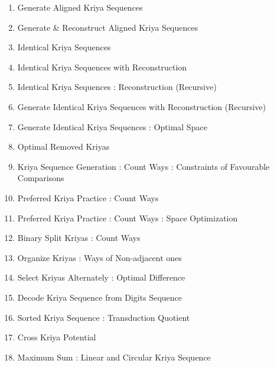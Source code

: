 \begin{enumerate}[noitemsep]
    \item Generate Aligned Kriya Sequences 
    \item Generate \& Reconstruct Aligned Kriya Sequences
    \item Identical Kriya Sequences
    \item Identical Kriya Sequences with Reconstruction 
    \item Identical Kriya Sequences : Reconstruction (Recursive) 
    \item Generate Identical Kriya Sequences with Reconstruction (Recursive) 
    \item Generate Identical Kriya Sequences : Optimal Space
    \item Optimal Removed Kriyas 
    \item Kriya Sequence Generation : Count Ways : Constraints of Favourable Comparisons 
    \item Preferred Kriya Practice : Count Ways 
    \item Preferred Kriya Practice : Count Ways : Space Optimization
    \item Binary Split Kriyas : Count Ways 
    \item Organize Kriyas : Ways of Non-adjacent ones 
    \item Select Kriyas Alternately : Optimal Diﬀerence 
    \item Decode Kriya Sequence from Digits Sequence 
    \item Sorted Kriya Sequence : Transduction Quotient 
    \item Cross Kriya Potential
    \item Maximum Sum : Linear and Circular Kriya Sequence
\end{enumerate}









